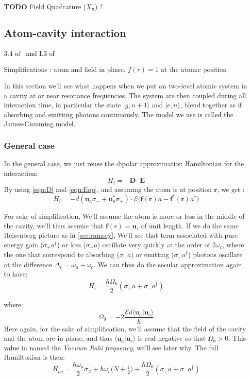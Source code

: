 \documentclass[10pt]{report}
\theoremstyle{plain}
\theoremstyle{definition}
\theoremstyle{remark}
\newcommand{\TODO}{\textbf{TODO}}
\newcommand{\ket}[1]{|#1\rangle}
\newcommand{\braket}[2]{\langle#1|#2\rangle}
\newcommand{\bs}{\boldsymbol}
\begin{document}
\TODO{} Field Quadrature ($X_\pi$) ?

\subsection{Atom-cavity interaction}

3.4 of~\cite{Har06} and I.3 of~\cite{SayPHD11}

Simplifications : atom and field in phase, $f(r) = 1$ at the atomic position

In this section we'll see what happens when we put an two-level atomic system in
a cavity at or near resonance frequencies. The system are then coupled during
all interaction time, in particular the state $\ket{g,n+1}$ and $\ket{e,n}$,
blend together as if absorbing and emitting photons continuously. The model we
use is called the James-Cumming model.

\subsubsection{General case}

In the general case, we just reuse the dipolar approximation Hamiltonian for the
interaction:
\[H_i = - \bs D \cdot \bs E\]
By using \cref{eqn:D} and \cref{eqn:Eop}, and assuming the atom is at
position $\bs r$, we get :
\[H_i = - d(\bs u_a \sigma_- + \bs u_a^* \sigma_+) \cdot \mathcal{E}\big(\bs
  f(\bs r) a - \bs f^*(\bs r)
  a^\dagger \big)
  \]


For sake of simplification, We'll assume the atom is more or less in the middle
of the cavity, we'll thus assume that $\bs f(r) = \bs u_c$ of unit length.
If we do the same Heisenberg picture as in \cref{sec:ramsey}, We'll see that
term associated with pure energy gain ($\sigma_+a^\dagger$) or loss ($\sigma_-a$)
oscillate very quickly at the order of $2\omega_c$,
where the one that correspond to absorbing ($\sigma_+a$) or emitting
($\sigma_-a^\dagger$) photons oscillate at the difference $\Delta_c = \omega_a -
\omega_c$. We can
thus do the secular approximation again to have:
\begin{equation}
  H_i = \frac{\hbar \Omega_0}2 (\sigma_+a + \sigma_-a^\dagger)
\end{equation}

where:
\[\Omega_0 = -2\frac {\mathcal{E}d \braket{\bs u_a}{\bs u_c}}{\hbar}\]
Here again, for the sake of simplification, we'll assume that the field of the
cavity and the atom are in phase, and thus $\braket{\bs u_a}{\bs u_c}$ is real
negative so that $\Omega_0 > 0$. This value in named the \emph{Vacuum Rabi
  frequency}, we'll see later why. The full Hamiltonian is then:
\begin{equation}
H_{ac} = \frac{\hbar \omega_a}2 \sigma_Z + \hbar \omega_c \big(N +
  \tfrac12\big) + \frac{\hbar \Omega_0}2 (\sigma_+a + \sigma_-a^\dagger)
\end{equation}
\end{document}
